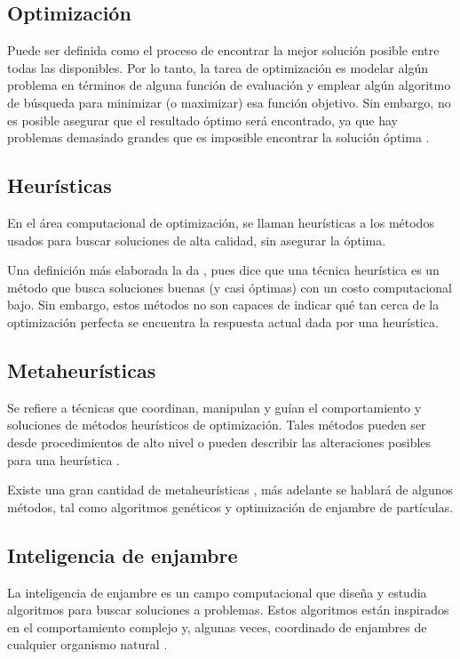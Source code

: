 \documentclass[letterpaper]{report}
\begin{document}
  \subsection{Optimización}
    Puede ser definida como el proceso de encontrar la mejor solución posible
    entre todas las disponibles. Por lo tanto, la tarea de optimización es
    modelar algún problema en términos de alguna función de evaluación y emplear
    algún algoritmo de búsqueda para minimizar (o maximizar) esa función
    objetivo. Sin embargo, no es posible asegurar que el resultado óptimo será
    encontrado, ya que hay problemas demasiado grandes que es imposible
    encontrar la solución óptima \cite{SearchMethodologies}.
  
  \subsection{Heurísticas}
    En el área computacional de optimización, se llaman heurísticas a los
    métodos usados para buscar soluciones de alta calidad, sin asegurar la
    óptima.

    Una definición más elaborada la da \cite{HeuristicDef}, pues dice
    que una técnica heurística es un método que busca soluciones buenas (y casi
    óptimas) con un costo computacional bajo. Sin embargo, estos métodos no son
    capaces de indicar qué tan cerca de la optimización perfecta se encuentra 
    la respuesta actual dada por una heurística.
  
  \subsection{Metaheurísticas}
    Se refiere a técnicas que coordinan, manipulan y guían el comportamiento y
    soluciones de métodos heurísticos de optimización. Tales métodos pueden ser
    desde procedimientos de alto nivel o pueden describir las alteraciones
    posibles para una heurística \cite{MetaheuristicsDef}.

    Existe una gran cantidad de metaheurísticas
    \cite{HeuristicDef, SearchMethodologies}, más adelante se hablará de algunos
    métodos, tal como algoritmos genéticos y optimización de enjambre de
    partículas.
  
  \subsection{Inteligencia de enjambre}
    La inteligencia de enjambre es un campo computacional que diseña y estudia
    algoritmos para buscar soluciones a problemas. Estos algoritmos están 
    inspirados en el comportamiento complejo y, algunas veces, coordinado de
    enjambres de cualquier organismo natural \cite{SearchMethodologies}. 
    
\end{document}
